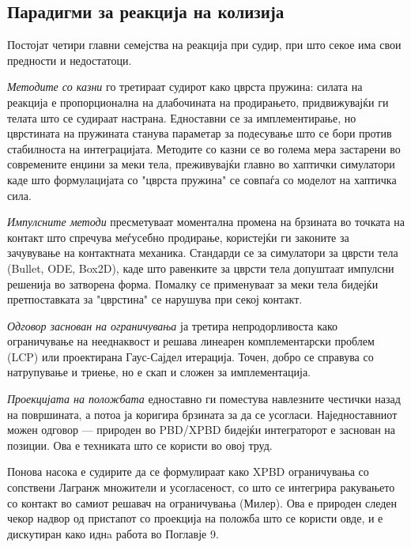 \subsection{Парадигми за реакција на колизија}

Постојат четири главни семејства на реакција при судир, при што секое има свои предности и недостатоци.

\textit{Методите со казни}\cite{hahn1988realistic} го третираат судирот како цврста пружина: силата на реакција е пропорционална на длабочината на продирањето, придвижувајќи ги телата што се судираат настрана. Едноставни се за имплементирање, но цврстината на пружината станува параметар за подесување што се бори против стабилноста на интеграцијата. Методите со казни се во голема мера застарени во современите енџини за меки тела, преживувајќи главно во хаптички симулатори каде што формулацијата со "цврста пружина" се совпаѓа со моделот на хаптичка сила.

\textit{Импулсните методи} \cite{Mirtich1996ImpulsebasedDS} пресметуваат моментална промена на брзината во точката на контакт што спречува меѓусебно продирање, користејќи ги законите за зачувување на контактната механика. Стандарди се за симулатори за цврсти тела (Bullet, ODE, Box2D), каде што равенките за цврсти тела допуштаат импулсни решенија во затворена форма. Помалку се применуваат за меки тела бидејќи претпоставката за "цврстина" се нарушува при секој контакт.

\textit{Одговор заснован на ограничувања}\cite{BaraffDavidWitkin1998} \cite{bridson2002robust} ја третира непродорливоста како ограничување на нееднаквост и решава линеарен комплементарски проблем (LCP) или проектирана Гаус-Сајдел итерација. Точен, добро се справува со натрупување и триење, но е скап и сложен за имплементација.

\textit{Проекцијата на положбата} едноставно ги поместува навлезните честички назад на површината, а потоа ја коригира брзината за да се усогласи. Наједноставниот можен одговор — природен во PBD/XPBD бидејќи интеграторот е заснован на позиции. Ова е техниката што се користи во овој труд.
   
Понова насока е судирите да се формулираат како XPBD ограничувања со сопствени Лагранж множители и усогласеност, со што се интегрира ракувањето со контакт во самиот решавач на ограничувања (Милер\cite{muller2020detailed}). Ова е природен следен чекор надвор од пристапот со проекција на положба што се користи овде, и е дискутиран како иднa работа во Поглавје 9.

